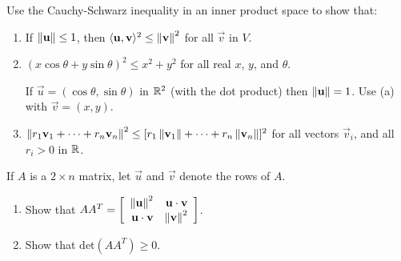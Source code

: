 \documentclass{ximera}
\begin{document}
\begin{problem}\label{prob:inner_prod_29}
Use the Cauchy-Schwarz inequality in an inner product space to show that:

\begin{enumerate} 
\item If $\left\lVert\mathbf{u}\right\rVert \leq 1$, then $\langle\mathbf{u}, \mathbf{v}\rangle^{2} \leq \left\lVert\mathbf{v}\right\rVert^{2}$ for all $\vec{v}$ in $V$.

\item $(x \cos \theta + y \sin \theta)^{2} \leq x^{2} + y^{2}$ for all real $x$, $y$, and $\theta$.

\begin{hint}
If $\vec{u} = (\cos \theta, \sin \theta)$ in $\mathbb{R}^2$ (with the dot product) then $\left\lVert\mathbf{u}\right\rVert = 1$. Use (a) with $\vec{v} = (x, y)$.
\end{hint}

\item $\left\lVert r_1\mathbf{v}_1 + \dots + r_n\mathbf{v}_n \right\rVert ^2 \leq [r_1 \left\lVert \mathbf{v}_1 \right\rVert + \dots + r_n \left\lVert \mathbf{v}_n \right\rVert ]^2$
for all vectors $\vec{v}_{i}$, and all $r_{i} > 0$ in $\mathbb{R}$.

\end{enumerate}

\end{problem}

\begin{problem}\label{prob:inner_prod_30}
If $A$ is a $2 \times n$ matrix, let $\vec{u}$ and $\vec{v}$ denote the rows of $A$.

\begin{enumerate} 
\item Show that
$AA^T = \left[ \begin{array}{rr}
\left\lVert \mathbf{u} \right\rVert ^2 & \mathbf{u} \cdot \mathbf{v} \\
\mathbf{u} \cdot \mathbf{v} & \left\lVert \mathbf{v} \right\rVert ^2
\end{array} \right]$.

\item Show that $\mbox{det}(AA^{T}) \geq 0$.

\end{enumerate}
\end{problem}
\end{document}
